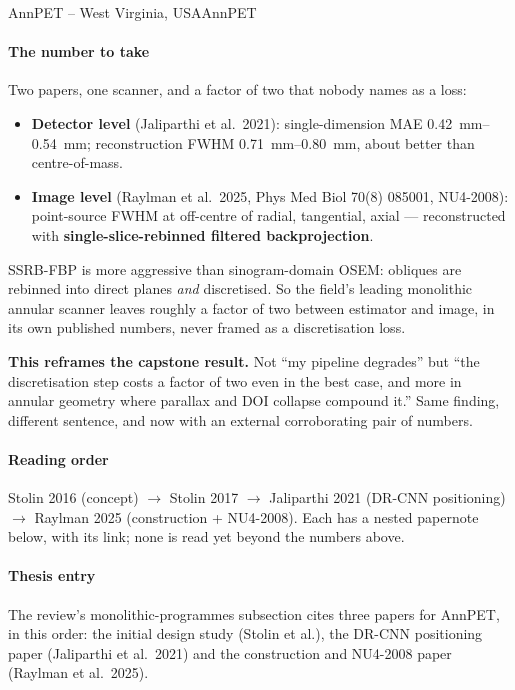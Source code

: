 \begin{programnote}{AnnPET -- West Virginia, USA}{AnnPET}
\paragraph{The number to take}
Two papers, one scanner, and a factor of two that nobody names as a loss:
\begin{itemize}
	\item \textbf{Detector level} (Jaliparthi et al.\ 2021): single-dimension
		MAE \qtyrange{0.42}{0.54}{\milli\metre}; reconstruction FWHM
		\qtyrange{0.71}{0.80}{\milli\metre}, about  better than
		centre-of-mass.
	\item \textbf{Image level} (Raylman et al.\ 2025, Phys Med Biol 70(8)
		085001, NU4-2008): point-source FWHM at  off-centre of
		 radial,  tangential,  axial ---
		reconstructed with \textbf{single-slice-rebinned filtered
		backprojection}.
\end{itemize}
 
SSRB-FBP is more aggressive than sinogram-domain OSEM: obliques are rebinned
into direct planes \emph{and} discretised. So the field's leading monolithic
annular scanner leaves roughly a factor of two between estimator and image, in
its own published numbers, never framed as a discretisation loss.
 
\textbf{This reframes the capstone result.} Not ``my pipeline degrades'' but
``the discretisation step costs a factor of two even in the best case, and more
in annular geometry where parallax and DOI collapse compound it.'' Same finding,
different sentence, and now with an external corroborating pair of numbers.
 
\paragraph{Reading order}
Stolin 2016 (concept) $\rightarrow$ Stolin 2017 $\rightarrow$ Jaliparthi 2021
(DR-CNN positioning) $\rightarrow$ Raylman 2025 (construction + NU4-2008).
Each has a nested papernote below, with its link; none is read yet beyond the
numbers above. 
 
\paragraph{Thesis entry}
The review's monolithic-programmes subsection cites three papers for AnnPET, in
this order: the initial design study (Stolin et al.), the DR-CNN positioning
paper (Jaliparthi et al.\ 2021) and the construction and NU4-2008 paper
(Raylman et al.\ 2025).
 

\end{programnote}
